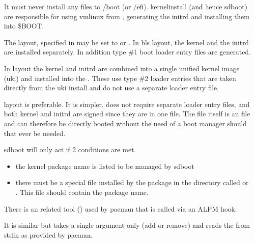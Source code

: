 \documentclass[letterpaper,11pt,english]{sphinxmanual}
\begin{document}
\sphinxAtStartPar
It must never install any files to /boot (or /efi). kernel\sphinxhyphen{}install (and hence sd\sphinxhyphen{}boot)
are responsible for using vmlinux from , generating the initrd
and installing them into \$BOOT.

\sphinxAtStartPar
The layout, specified in  may be set to  or .
In bls layout, the kernel and the initrd are installed separately. In addition
type \#1 boot loader entry files are generated.

\sphinxAtStartPar
In  layout the kernel and initrd are combined into a single unified kernel image (uki)
and installed into the . These use type \#2 loader entries that are taken directly from the
uki install and do not use a separate loader entry file,

\sphinxAtStartPar
{} layout is preferable. It is simpler, does not require separate loader entry
files, and both kernel and initrd are signed since they are in one file. The  file
itself is an  file and can therefore be directly booted without the need of a boot manager
should that ever be needed.

\sphinxAtStartPar
sd\sphinxhyphen{}boot will only act if 2 conditions are met.
\begin{itemize}
\item {} 
\sphinxAtStartPar
the kernel package name is listed to be managed by sd\sphinxhyphen{}boot

\item {} 
\sphinxAtStartPar
there must be a special file installed by the package in the
 directory called  or .
This file should contain the package name.

\end{itemize}

\sphinxAtStartPar
There is an related tool () used by pacman that is
called via an ALPM hook.

\sphinxAtStartPar
It is similar but takes a single argument only (add or remove) and reads the 
from stdin as provided by pacman.
\end{document}
